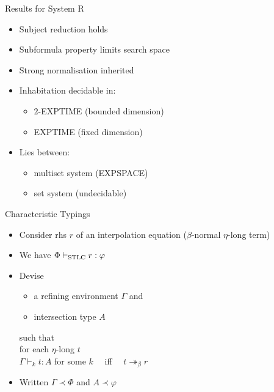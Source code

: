 \documentclass{beamer}
\renewcommand{\:}{\mbox{\,:\,}\xspace}
\begin{document}
\begin{frame}{Results for System R}
  \begin{itemize}
  \item Subject reduction holds
  \item Subformula property limits search space
  \item Strong normalisation inherited
  \item Inhabitation decidable in:
    \begin{itemize}
        \item $2$-EXPTIME (bounded dimension)
        \item EXPTIME (fixed dimension)
    \end{itemize}
    \item Lies between:
    \begin{itemize}
        \item multiset system (EXPSPACE)
        \item set system (undecidable)
    \end{itemize}
\end{itemize}
\end{frame}


\begin{frame}{Characteristic Typings}
  \begin{itemize}
  \item Consider rhs $r$ of an interpolation equation ($\beta$-normal $\eta$-long term)
  \item We have $\Phi \vdash_{\textnormal{STLC}} r : \varphi$
  \item Devise
    \begin{itemize}
    \item a refining environment $\Gamma$ and 
    \item intersection type $A$
    \end{itemize}
    such that\\[2ex]
    for each $\eta$-long $t$\\
    $\Gamma \vdash_k t : A$ for some $k\quad$ iff $\quad t\twoheadrightarrow_\beta r$\\[2ex]
  \item Written $\Gamma \prec \Phi$ and $A \prec \varphi$
\end{itemize}
\end{frame}

\end{document}
